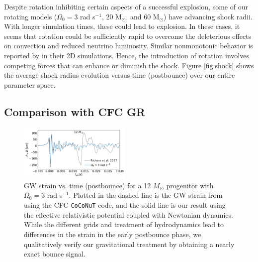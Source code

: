 \documentclass[twocolumn,times]{aastex62}  %
\newcommand{\Msun}{\ensuremath{\mathrm{M}_\odot}\xspace}
\begin{document}
Despite rotation inhibiting certain aspects of a successful explosion, some of our rotating models ($\Omega_0 = 3$ rad s$^{-1}$, 20 \Msun, and 60 \Msun) have advancing shock radii.  With longer simulation times, these could lead to explosion.  In these cases, it seems that rotation could be sufficiently rapid to overcome the deleterious effects on convection and reduced neutrino luminosity.
Similar nonmonotonic behavior is reported by \citet{summa:2018} in their 2D simulations.
Hence, the introduction of rotation involves competing forces that can enhance or diminish the shock.  Figure \ref{fig:shock} shows the average shock radius evolution versus time (postbounce) over our entire parameter space.

\subsection{Comparison with CFC GR}

 \begin{figure}[t]
    \centering
    \includegraphics[width=0.48\textwidth]{bounce_richers.pdf}
    \caption{GW strain vs. time (postbounce) for a 12 \(M_\odot\) progenitor \citep{woosley:2007} with $\Omega_0 = 3$ rad s$^{-1}$.  Plotted in the dashed line is the GW strain from \citet{richers:2017} using the CFC \texttt{CoCoNuT} code, and the solid line is our result using the effective relativistic potential coupled with Newtonian dynamics.  While the different grids and treatment of hydrodynamics lead to differences in the strain in the early postbounce phase, we qualitatively verify our gravitational treatment by obtaining a nearly exact bounce signal. }
    \label{fig:bounce_cfc}
\end{figure}
\end{document}
